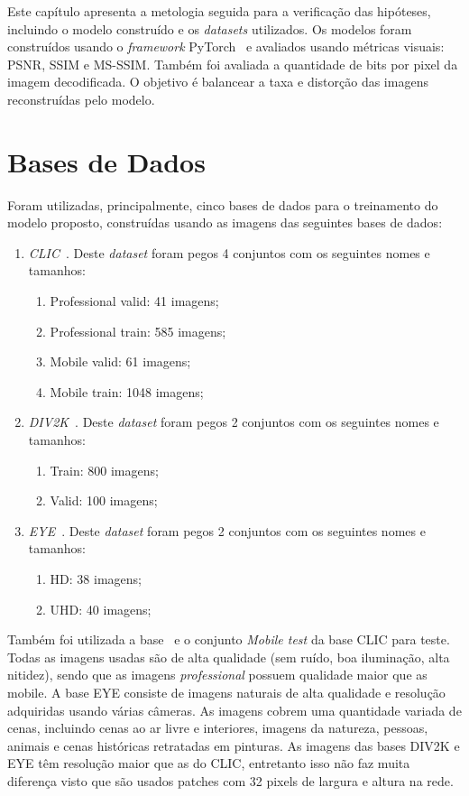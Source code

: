 Este capítulo apresenta a metologia seguida para a verificação das hipóteses, incluindo o modelo construído e os \textit{datasets} utilizados. Os modelos foram construídos usando o \textit{framework} PyTorch~\cite{pytorch} e avaliados usando métricas visuais: \acrshort{PSNR}, \acrshort{SSIM} e \acrshort{MS-SSIM}. Também foi avaliada a quantidade de bits por pixel da imagem decodificada. O objetivo é balancear a taxa e distorção das imagens reconstruídas pelo modelo.

\section{Bases de Dados}%
Foram utilizadas, principalmente, cinco bases de dados para o treinamento do modelo proposto, construídas usando as imagens das seguintes bases de dados:
\begin{enumerate}
    \item \emph{\acrshort{CLIC}}~\cite{clic}. Deste \textit{dataset} foram pegos 4 conjuntos com os seguintes nomes e tamanhos:
    \begin{enumerate}
        \item Professional valid: 41 imagens;
        \item Professional train: 585 imagens;
        \item Mobile valid: 61 imagens;
        \item Mobile train: 1048 imagens;
    \end{enumerate}
    \item \emph{\acrshort{DIV2K}}~\cite{div2k}. Deste \textit{dataset} foram pegos 2 conjuntos com os seguintes nomes e tamanhos:
    \begin{enumerate}
        \item Train: 800 imagens;
        \item Valid: 100 imagens;
    \end{enumerate}
    \item \emph{\acrshort{EYE}}~\cite{ultra_eye}. Deste \textit{dataset} foram pegos 2 conjuntos com os seguintes nomes e tamanhos:
    \begin{enumerate}
        \item HD: 38 imagens;
        \item UHD: 40 imagens;
    \end{enumerate}
\end{enumerate}
Também foi utilizada a base~\cite{kodak} e o conjunto \textit{Mobile test} da base \acrshort{CLIC} para teste. Todas as imagens usadas são de alta qualidade (sem ruído, boa iluminação, alta nitidez), sendo que as imagens \textit{professional} possuem qualidade maior que as {mobile}. A base \acrshort{EYE} consiste de imagens naturais de alta qualidade e resolução adquiridas usando várias câmeras. As imagens cobrem uma quantidade variada de cenas, incluindo cenas ao ar livre e interiores, imagens da natureza, pessoas, animais e cenas históricas retratadas em pinturas. As imagens das bases \acrshort{DIV2K} e \acrshort{EYE} têm resolução maior que as do \acrshort{CLIC}, entretanto isso não faz muita diferença visto que são usados patches com 32 pixels de largura e altura na rede.

